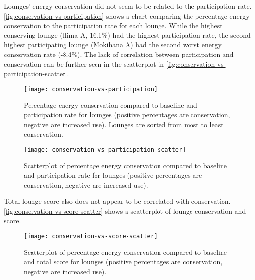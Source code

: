 Lounges' energy conservation did not seem to be related to the participation rate. \autoref{fig:conservation-vs-participation} shows a chart comparing the percentage energy conservation to the participation rate for each lounge. While the highest conserving lounge (Ilima A, 16.1\%) had the highest participation rate, the second highest participating lounge (Mokihana A) had the second worst energy conservation rate (-8.4\%). The lack of correlation between participation and conservation can be further seen in the scatterplot in \autoref{fig:conservation-vs-participation-scatter}.

\begin{figure}[htbp]
	\centering
	\texttt{[image: conservation-vs-participation]}
	\caption[Percentage energy conservation and participation rate for lounges]{Percentage energy conservation compared to baseline and participation rate for lounges (positive percentages are conservation, negative are increased use). Lounges are sorted from most to least conservation.}
	\label{fig:conservation-vs-participation}
\end{figure}

\begin{figure}[htbp]
	\centering
	\texttt{[image: conservation-vs-participation-scatter]}
	\caption[Scatterplot of percentage energy conservation and participation rate for lounges]{Scatterplot of percentage energy conservation compared to baseline and participation rate for lounges (positive percentages are conservation, negative are increased use).}
	\label{fig:conservation-vs-participation-scatter}
\end{figure}

Total lounge score also does not appear to be correlated with conservation. \autoref{fig:conservation-vs-score-scatter} shows a scatterplot of lounge conservation and score.

\begin{figure}[htbp]
	\centering
	\texttt{[image: conservation-vs-score-scatter]}
	\caption[Scatterplot of percentage energy conservation and score for lounges]{Scatterplot of percentage energy conservation compared to baseline and total score for lounges (positive percentages are conservation, negative are increased use).}
	\label{fig:conservation-vs-score-scatter}
\end{figure}

